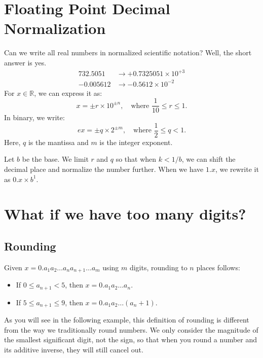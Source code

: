 \newcommand{\fl}{\operatorname{fl}}

\section{Floating Point Decimal Normalization}

Can we write all real numbers in normalized scientific notation? Well, the short
answer is yes.
\begin{align*}
    732.5051 &\rightarrow +0.7325051 \times 10^{+3} \\
    -0.005612 &\rightarrow -0.5612 \times 10^{-2}
\end{align*}
For $x \in \mathbb{R}$, we can express it as:
\begin{equation*}
    x = \pm r \times 10^{\pm n}, \quad \text{where } \frac{1}{10} \leq r \leq 1.
\end{equation*}
In binary, we write:
\begin{equation*}
  e x = \pm q \times 2^{\pm m}, \quad \text{where } \frac{1}{2} \leq q < 1.
\end{equation*}
Here, $q$ is the mantissa and $m$ is the integer exponent.

Let $b$ be the base.
We limit $r$ and $q$ so that when $k < 1/b$, we can shift the decimal 
place and normalize the number further. When we have $1.x$, we rewrite it 
as $0.x \times b^1$.

\section{What if we have too many digits?}
\subsection{Rounding}
Given $x = 0.a_1 a_2 \dots a_n a_{n+1} \dots a_m$ using $m$ digits, rounding 
to $n$ places follows:
\begin{itemize}
    \item If $0 \leq a_{n+1} < 5$, then $x = 0.a_1 a_2 \dots a_n$.
    \item If $5 \leq a_{n+1} \leq 9$, then $x = 0.a_1 a_2 \dots (a_n + 1)$.
\end{itemize}
As you will see in the following example, this definition of rounding is
different from the way we traditionally round numbers. We only consider the
magnitude of the smallest significant digit, not the sign, so that when you
round a number and its additive inverse, they will still cancel out.

